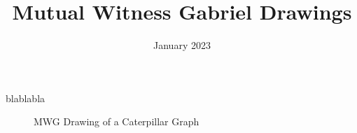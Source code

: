 \documentclass[12pt,a4paper]{article}
\title{Mutual Witness Gabriel Drawings}
\date{January 2023}
\begin{document}
\frenchspacing

\maketitle

blablabla

\begin{figure}[ht!]
\begin{center}

\end{center}
\caption{MWG Drawing of a Caterpillar Graph}
\end{figure}
\end{document}
